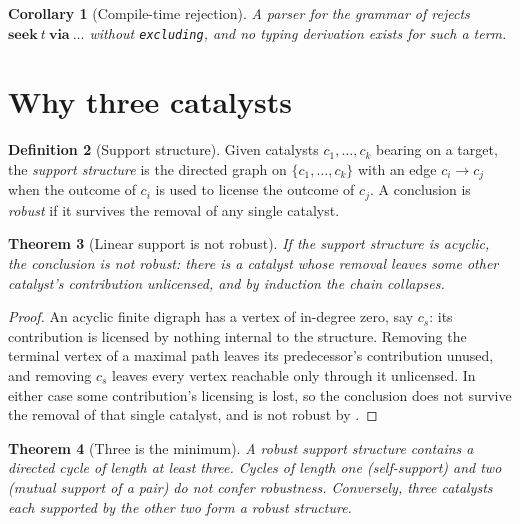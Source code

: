 \documentclass[11pt,a4paper]{article}
\theoremstyle{thmstyle}
\newtheorem{theorem}{Theorem}[section]
\newtheorem{corollary}[theorem]{Corollary}
\theoremstyle{definition}
\newtheorem{definition}[theorem]{Definition}
\theoremstyle{remark}
\newcommand{\seek}{\mathbf{seek}}
\newcommand{\via}{\mathbf{via}}
\begin{document}
\begin{corollary}[Compile-time rejection]
\label{cor:reject}
A parser for the grammar of  rejects
$\seek\ t\ \via\ \dots$ without \texttt{excluding}, and no typing derivation
exists for such a term.
\end{corollary}

\section{Why three catalysts}
\label{sec:coherence}

\begin{definition}[Support structure]
\label{def:support}
Given catalysts $c_1,\dots,c_k$ bearing on a target, the \emph{support
structure} is the directed graph on $\{c_1,\dots,c_k\}$ with an edge
$c_i\to c_j$ when the outcome of $c_i$ is used to license the outcome of
$c_j$. A conclusion is \emph{robust} if it survives the removal of any
single catalyst.
\end{definition}

\begin{theorem}[Linear support is not robust]
\label{thm:linear}
If the support structure is acyclic, the conclusion is not robust: there is a
catalyst whose removal leaves some other catalyst's contribution
unlicensed, and by induction the chain collapses.
\end{theorem}

\begin{proof}
An acyclic finite digraph has a vertex of in-degree zero, say $c_s$: its
contribution is licensed by nothing internal to the structure. Removing the
terminal vertex of a maximal path leaves its predecessor's contribution
unused, and removing $c_s$ leaves every vertex reachable only through it
unlicensed. In either case some contribution's licensing is lost, so the
conclusion does not survive the removal of that single catalyst, and is not
robust by .
\end{proof}

\begin{theorem}[Three is the minimum]
\label{thm:three}
A robust support structure contains a directed cycle of length at least
three. Cycles of length one \textup{(}self-support\textup{)} and two
\textup{(}mutual support of a pair\textup{)} do not confer robustness.
Conversely, three catalysts each supported by the other two form a robust
structure.
\end{theorem}
\end{document}
